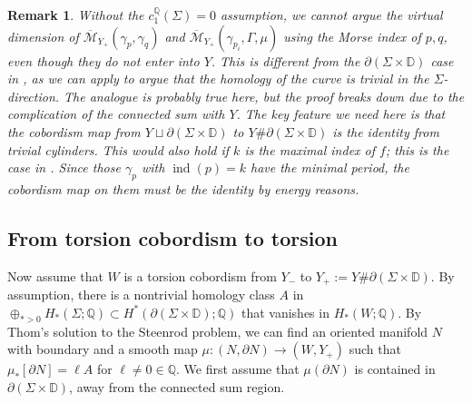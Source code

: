 \documentclass[11pt]{amsart}
\numberwithin{equation}{section}
\newtheorem{remark}[theorem]{\textbf{Remark}}
\def\D{{\mathbb D}}
\def\Q{{\mathbb Q}}
\def\cM{{\mathcal M}}
\DeclareMathOperator{\ind}{ind}
\begin{document}
\begin{remark}
   Without the $c_1^{\Q}(\Sigma)=0$ assumption, we cannot argue the virtual dimension of $\overline{\cM}_{Y_+}(\gamma_p,\gamma_q)$ and $\overline{\cM}_{Y_+}(\gamma_{p_i},\Gamma,\mu)$ using the Morse index of $p,q$, even though they do not enter into $Y$. This is different from the $\partial(\Sigma \times \D)$ case in , as we can apply \cite[Proposition 4.6]{arXiv:2506.06807} to argue that the homology of the curve is trivial in the $\Sigma$-direction. The analogue is probably true here, but the proof breaks down due to the complication of the connected sum with $Y$. The key feature we need here is that the cobordism map from $Y\sqcup \partial(\Sigma \times \D)$ to $Y\#\partial(\Sigma \times \D)$ is the identity from trivial cylinders. This would also hold if $k$ is the maximal index of $f$; this is the case in \cite[Proposition 4.5]{bowden2022tight}. Since those $\gamma_{p}$ with $\ind(p)=k$ have the minimal period, the cobordism map on them must be the identity by energy reasons.
\end{remark}



\subsection{From torsion cobordism to torsion}\label{ss:torsion}
Now assume that $W$ is a torsion cobordism from $Y_-$ to $Y_+:=Y\#\partial(\Sigma \times \D)$. By assumption, there is a nontrivial homology class $A$ in $\oplus_{*>0}H_*(\Sigma;\Q)\subset H^*(\partial(\Sigma \times \D);\Q)$ that vanishes in $H_*(W;\Q)$. By Thom's solution to the Steenrod problem, we can find an oriented manifold $N$ with boundary and a smooth map $\mu:(N,\partial N) \to (W,Y_+)$ such that $\mu_*[\partial N]=\ell A$ for $\ell \ne 0 \in \Q$. We first assume that $\mu(\partial N)$ is contained in $\partial(\Sigma \times \D)$, away from the connected sum region.
\end{document}
